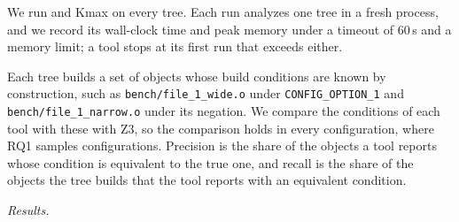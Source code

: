 \documentclass[acmsmall,screen,review,anonymous,nonacm]{acmart}
\begin{document}
We run \tool{} and Kmax on every tree.
Each run analyzes one tree in a fresh process, and we record its wall-clock time and peak memory under a timeout of 60\,s and a memory limit; a tool stops at its first run that exceeds either.

Each tree builds a set of objects whose build conditions are known by construction, such as \texttt{bench/file\_1\_wide.o} under \texttt{CONFIG\_OPTION\_1} and \texttt{bench/file\_1\_narrow.o} under its negation.
We compare the conditions of each tool with these with Z3, so the comparison holds in every configuration, where RQ1 samples configurations.
Precision is the share of the objects a tool reports whose condition is equivalent to the true one, and recall is the share of the objects the tree builds that the tool reports with an equivalent condition.

\emph{Results.}
\end{document}
